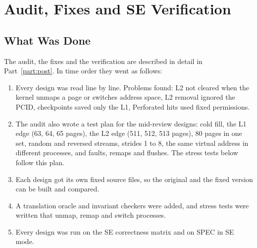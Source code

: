 \section{Audit, Fixes and SE Verification}
\label{sec:chr_audit}

\subsection{What Was Done}
The audit, the fixes and the verification are described in detail in Part~\ref{part:post}. In time order they went as follows:
\begin{enumerate}
    \item Every design was read line by line. Problems found: L2 not cleared when the kernel unmaps a page or switches address space, L2 removal ignored the PCID, checkpoints saved only the L1, Perforated hits used fixed permissions.
    \item The audit also wrote a test plan for the mid-review designs: cold fill, the L1 edge (63, 64, 65 pages), the L2 edge (511, 512, 513 pages), 80 pages in one set, random and reversed streams, strides 1 to 8, the same virtual address in different processes, and faults, remaps and flushes. The stress tests below follow this plan.
    \item Each design got its own fixed source files, so the original and the fixed version can be built and compared.
    \item A translation oracle and invariant checkers were added, and stress tests were written that unmap, remap and switch processes.
    \item Every design was run on the SE correctness matrix and on SPEC in SE mode.
\end{enumerate}

